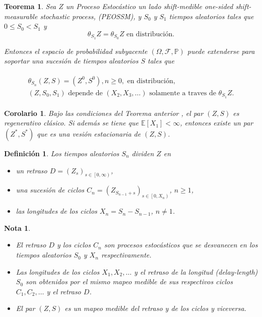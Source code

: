 \documentclass{article}
\newtheorem{Def}{Definición}[section]
\newtheorem{Teo}{Teorema}[section]
\newtheorem{Note}{Nota}[section]
\newtheorem{Cor}{Corolario}[section]
\newcommand{\esp}{\mathbb{E}}
\newcommand{\prob}{\mathbb{P}}
\numberwithin{equation}{section}
\begin{document}
\begin{Teo}\label{Teorema.Importante}
Sea $Z$ un Proceso Estoc\'astico un lado shift-medible \textit{one-sided shift-measurable stochastic process}, (PEOSSM), y $S_{0}$ y $S_{1}$ tiempos aleatorios tales que $0\leq S_{0}<S_{1}$ y
\begin{equation}
\theta_{S_{1}}Z=\theta_{S_{0}}Z\textrm{ en distribuci\'on}.
\end{equation}

Entonces el espacio de probabilidad subyacente $\left(\Omega,\mathcal{F},\prob\right)$ puede extenderse para soportar una sucesi\'on de tiempos aleatorios $S$ tales que

\begin{eqnarray}
\begin{array}{l}
\theta_{S_{n}}\left(Z,S\right)=\left(Z^{0},S^{0}\right),n\geq0,\textrm{ en distribuci\'on},\\
\left(Z,S_{0},S_{1}\right)\textrm{ depende de }\left(X_{2},X_{3},\ldots\right)\textrm{ solamente a traves de }\theta_{S_{1}}Z.
\end{array}
\end{eqnarray}
\end{Teo}


\begin{Cor}\label{Tma.Estacionariedad}
Bajo las condiciones del Teorema anterior , el par $\left(Z,S\right)$ es regenerativo cl\'asico. Si adem\'as se tiene que $\esp\left[X_{1}\right]<\infty$, entonces existe un par $\left(Z^{*},S^{*}\right)$ que es una vesi\'on estacionaria de $\left(Z,S\right)$.
\end{Cor}

\begin{Def}
Los tiempos aleatorios $S_{n}$ dividen $Z$ en 
\begin{itemize}
\item[a)] un retraso $D=\left(Z_{s}\right)_{s\in\left[0,\infty\right)}$,
\item[b)] una sucesi\'on de ciclos $C_{n}=\left(Z_{S_{n-1}+s}\right)_{ s\in\left[0,X_{n}\right)}$, $n\geq1$,
\item[c)] las longitudes de los ciclos $X_{n}=S_{n}-S_{n-1}$, $n\neq1$.
\end{itemize}
\end{Def}

\begin{Note}
\begin{itemize}
\item[a)] El retraso $D$ y los ciclos $C_{n}$ son procesos estoc\'asticos que se desvanecen en los tiempos aleatorios $S_{0}$ y $X_{n}$ respectivamente.
\item[b)] Las longitudes de los ciclos $X_{1},X_{2},\ldots$ y el retraso de la longitud (\textit{delay-length}) $S_{0}$ son obtenidos por el mismo mapeo medible de sus respectivos ciclos $C_{1},C_{2},\ldots$ y el retraso $D$. 
\item[c)] El par $\left(Z,S\right)$ es un mapeo medible del retraso y de los ciclos y viceversa.
\end{itemize}
\end{Note}
\end{document}

